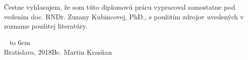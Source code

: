 \documentclass[12pt, a4paper, oneside]{book}
\newcommand\mfauthor{Bc. Martin Krasňan}
\newcommand\mfplacedate{Bratislava, 2018}
\begin{document}

\thispagestyle{empty}


\begin{figure}[H]
\begin{center}
\label{img:zadanie}
\end{center}
\end{figure}

{~}\vspace{12cm}

\noindent
\begin{minipage}{0.25\textwidth}~\end{minipage}
\begin{minipage}{0.75\textwidth}
Čestne vyhlasujem, že som túto diplomovú prácu vypracoval samostatne pod vedením doc. RNDr. Zuzany Kubincovej, PhD., s použitím zdrojov uvedených v zozname použitej literatúry.
\newline \newline
\end{minipage}
\vfill
~ \hfill {\hbox to 6cm{\dotfill}} \\
\mfplacedate \hfill \mfauthor
\vfill\eject 
\end{document}
